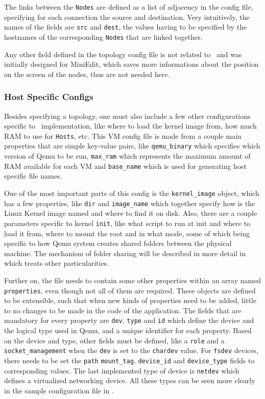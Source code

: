 The links between the \texttt{Nodes} are defined as a list of adjacency in the config file, specifying for each connection the source and destination.
Very intuitively, the names of the fields are \texttt{src} and \texttt{dest}, the values having to be specified by the hostnames of the corresponding \texttt{Nodes} that are linked together.

Any other field defined in the topology config file is not related to \project\ and was initially designed for MiniEdit, which saves more informations about the position on the screen of the nodes, thus are not needed here.

\subsubsection{Host Specific Configs}
\label{sub-sub-sec:vm-configs}

Besides specifying a topology, one must also include a few other configurations specific to \project\ implementation, like where to load the kernel image from, how much RAM to use for \texttt{Hosts}, etc.
This VM config file is made from a couple main properties that are simple key-value pairs, like \texttt{qemu_binary} which specifies which version of Qemu to be run, \texttt{max_ram} which represents the maximum amount of RAM available for each VM and \texttt{base_name} which is used for generating host specific file names.

One of the most important parts of this config is the \texttt{kernel_image} object, which has a few properties, like \texttt{dir} and \texttt{image_name} which together specify how is the Linux Kernel image named and where to find it on disk.
Also, there are a couple parameters specific to kernel \texttt{init}, like what script to run at init and where to load it from, where to mount the root and in what mode, some of which being specific to how Qemu system creates shared folders between the physical machine.
The mechanism of folder sharing will be described in more detail in  which treats other particularities.

Further on, the file needs to contain some other properties within an array named \texttt{properties}, even though not all of them are required.
These objects are defined to be extensible, such that when new kinds of properties need to be added, little to no changes to be made in the code of the application.
The fields that are mandatory for every property are \texttt{dev}, \texttt{type} and \texttt{id} which define the device and the logical type used in Qemu, and a unique identifier for each property.
Based on the device and type, other fields must be defined, like a \texttt{role} and a \texttt{socket_management} when the \texttt{dev} is set to the \texttt{chardev} value.
For \texttt{fsdev} devices, there needs to be set the \texttt{path} \texttt{mount_tag}, \texttt{device_id} and \texttt{device_type} fields to corresponding values.
The last implemented type of device is \texttt{netdev} which defines a virtualized networking device.
All these types can be seen more clearly in the sample configuration file in .

